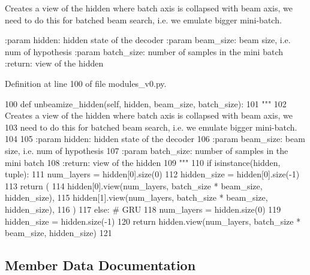 \begin{DoxyVerb}Creates a view of the hidden where batch axis is collapsed with beam axis, we
need to do this for batched beam search, i.e. we emulate bigger mini-batch.

:param hidden: hidden state of the decoder
:param beam_size: beam size, i.e. num of hypothesis
:param batch_size: number of samples in the mini batch
:return: view of the hidden
\end{DoxyVerb}
 

Definition at line 100 of file modules\+\_\+v0.\+py.


\begin{DoxyCode}
100     \textcolor{keyword}{def }unbeamize\_hidden(self, hidden, beam\_size, batch\_size):
101         \textcolor{stringliteral}{"""}
102 \textcolor{stringliteral}{        Creates a view of the hidden where batch axis is collapsed with beam axis, we}
103 \textcolor{stringliteral}{        need to do this for batched beam search, i.e. we emulate bigger mini-batch.}
104 \textcolor{stringliteral}{}
105 \textcolor{stringliteral}{        :param hidden: hidden state of the decoder}
106 \textcolor{stringliteral}{        :param beam\_size: beam size, i.e. num of hypothesis}
107 \textcolor{stringliteral}{        :param batch\_size: number of samples in the mini batch}
108 \textcolor{stringliteral}{        :return: view of the hidden}
109 \textcolor{stringliteral}{        """}
110         \textcolor{keywordflow}{if} isinstance(hidden, tuple):
111             num\_layers = hidden[0].size(0)
112             hidden\_size = hidden[0].size(-1)
113             \textcolor{keywordflow}{return} (
114                 hidden[0].view(num\_layers, batch\_size * beam\_size, hidden\_size),
115                 hidden[1].view(num\_layers, batch\_size * beam\_size, hidden\_size),
116             )
117         \textcolor{keywordflow}{else}:  \textcolor{comment}{# GRU}
118             num\_layers = hidden.size(0)
119             hidden\_size = hidden.size(-1)
120             \textcolor{keywordflow}{return} hidden.view(num\_layers, batch\_size * beam\_size, hidden\_size)
121 
\end{DoxyCode}


\subsection{Member Data Documentation}
\mbox{\label{classparlai_1_1agents_1_1legacy__agents_1_1seq2seq_1_1modules__v0_1_1Seq2seq_a005c8c9a0c2fc950aac6841b002284f9}} 
